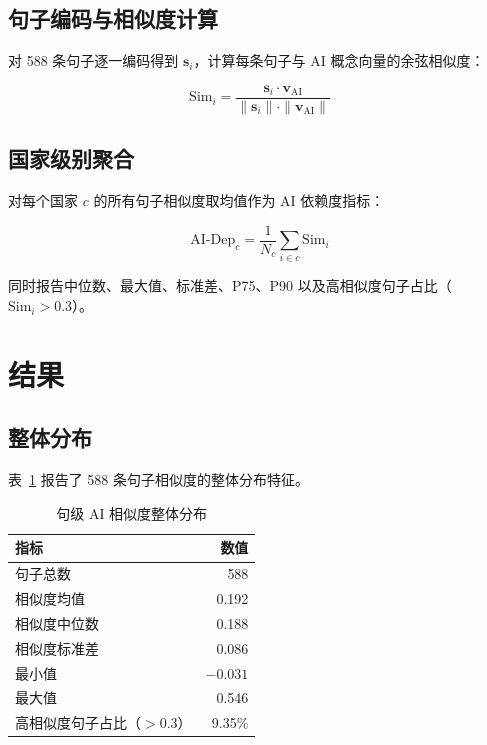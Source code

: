 \documentclass[11pt,a4paper]{article}
\begin{document}
\subsection{句子编码与相似度计算}

对 588 条句子逐一编码得到 $\mathbf{s}_i$，计算每条句子与 AI 概念向量的余弦相似度：

\begin{equation}
\text{Sim}_i = \frac{\mathbf{s}_i \cdot \mathbf{v}_{\text{AI}}}{\|\mathbf{s}_i\| \cdot \|\mathbf{v}_{\text{AI}}\|}
\end{equation}

\subsection{国家级别聚合}

对每个国家 $c$ 的所有句子相似度取均值作为 AI 依赖度指标：

\begin{equation}
\text{AI-Dep}_c = \frac{1}{N_c} \sum_{i \in c} \text{Sim}_i
\end{equation}

同时报告中位数、最大值、标准差、P75、P90 以及高相似度句子占比（$\text{Sim}_i > 0.3$）。

\section{结果}

\subsection{整体分布}

表~\ref{tab:dist} 报告了 588 条句子相似度的整体分布特征。

\begin{table}[H]
\centering
\caption{句级 AI 相似度整体分布}
\label{tab:dist}
\begin{tabular}{lr}
\toprule
\textbf{指标} & \textbf{数值} \\
\midrule
句子总数 & 588 \\
相似度均值 & 0.192 \\
相似度中位数 & 0.188 \\
相似度标准差 & 0.086 \\
最小值 & $-0.031$ \\
最大值 & 0.546 \\
高相似度句子占比（$>$0.3）& 9.35\% \\
\bottomrule
\end{tabular}
\end{table}
\end{document}
